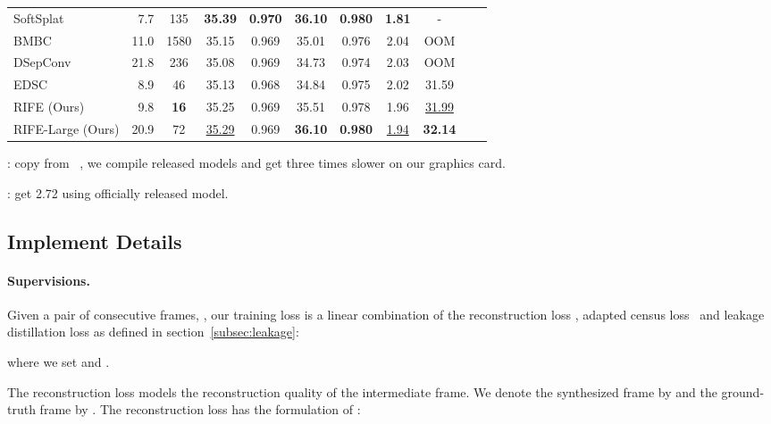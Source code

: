 \documentclass[10pt,twocolumn,letterpaper]{article}
\def\red#1{\textcolor{MyRed}{#1}}
\def\blue#1{\textcolor{MyBlue}{#1}}
\def\first#1{\red{\textbf{#1}}}
\def\second#1{\blue{\underline{#1}}}
\begin{document}
\begin{table*}
\begin{tabular}{lcccccccccc}
		SoftSplat~\cite{niklaus2020softmax} & ~7.7 & 135 & \first{35.39} & \first{0.970} & \first{36.10} & \first{0.980} & \first{1.81} & - \\
		    
		BMBC~\cite{park2020bmbc} & 11.0 & 1580 & 35.15 & {0.969} & 35.01 & 0.976 & 2.04 & OOM\\
		
		DSepConv~\cite{cheng2020video} & 21.8 & 236 & 35.08 & 0.969 & 34.73 & 0.974 & 2.03 & OOM\\
		
		EDSC~\cite{cheng2020multiple} & {~8.9} & 46 & 35.13 & 0.968 & 34.84 & 0.975 & 2.02 & 31.59\\
		\hline \hline
		
		RIFE (Ours) & {~9.8} & \first{16} & 35.25 & {0.969} & 35.51 & {0.978} & 1.96 & \second{31.99}\\
		
		RIFE-Large (Ours) & 20.9 & 72 & \second{35.29} & 0.969 & \first{36.10} & \first{0.980} & \second{1.94} & \first{32.14}
		\\
		\bottomrule
	\end{tabular} 
	\label{tab:comparison}
	\begin{tablenotes}
		\raggedleft
		\item{
   
    : copy from ~\cite{bao2019depth}, we compile released models and get three times slower on our graphics card.
    
    : get 2.72 using officially released model.
	}
	\end{tablenotes}\vspace{-1em}
\end{table*} 
\subsection{Implement Details}
\label{subsec:implement}

\paragraph{Supervisions.} Given a pair of consecutive frames, , our training loss  is a linear combination of the reconstruction loss , adapted census loss~\cite{meister2017unflow}  and leakage distillation loss  as defined in section~\ref{subsec:leakage}:  

where we set  and .

The reconstruction loss  models the reconstruction quality of the intermediate frame. We denote the synthesized frame by  and the ground-truth frame by .
The reconstruction loss has the formulation of :
\end{document}
